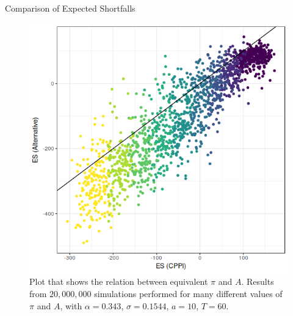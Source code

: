 \documentclass[10pt]{beamer}
\begin{document}
\begin{frame}[fragile]{Comparison of Expected Shortfalls}
  \begin{figure}[h]
    \centering
    \includegraphics[scale=0.35]{es-es_mort_new.png}
    \caption{Plot that shows the relation between equivalent $\pi$ and $A$. Results from $20,000,000$ simulations performed for many different values of $\pi$ and $A$, with $\alpha = 0.343$, $\sigma = 0.1544$, $a = 10$, $T = 60$.}
    \label{fig:es}
  \end{figure}
\end{frame}
\end{document}
